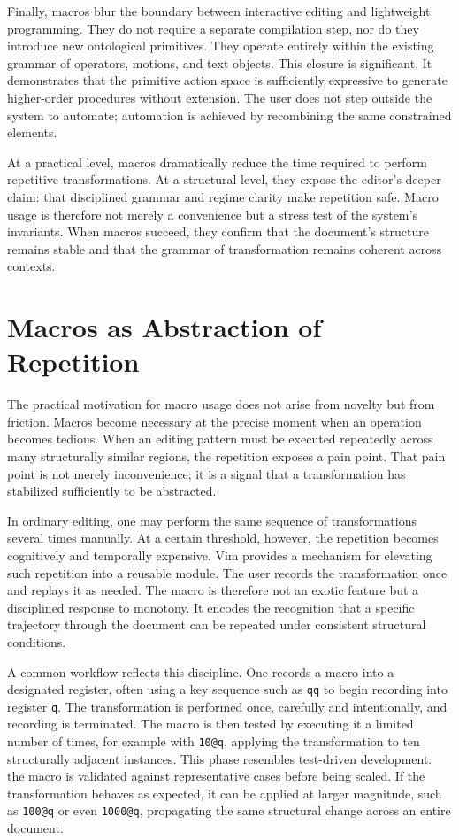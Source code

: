 \documentclass[12pt]{article}
\begin{document}
Finally, macros blur the boundary between interactive editing and lightweight programming. They do not require a separate compilation step, nor do they introduce new ontological primitives. They operate entirely within the existing grammar of operators, motions, and text objects. This closure is significant. It demonstrates that the primitive action space is sufficiently expressive to generate higher-order procedures without extension. The user does not step outside the system to automate; automation is achieved by recombining the same constrained elements.

At a practical level, macros dramatically reduce the time required to perform repetitive transformations. At a structural level, they expose the editor’s deeper claim: that disciplined grammar and regime clarity make repetition safe. Macro usage is therefore not merely a convenience but a stress test of the system’s invariants. When macros succeed, they confirm that the document’s structure remains stable and that the grammar of transformation remains coherent across contexts.

\section{Macros as Abstraction of Repetition}

The practical motivation for macro usage does not arise from novelty but from friction. Macros become necessary at the precise moment when an operation becomes tedious. When an editing pattern must be executed repeatedly across many structurally similar regions, the repetition exposes a pain point. That pain point is not merely inconvenience; it is a signal that a transformation has stabilized sufficiently to be abstracted.

In ordinary editing, one may perform the same sequence of transformations several times manually. At a certain threshold, however, the repetition becomes cognitively and temporally expensive. Vim provides a mechanism for elevating such repetition into a reusable module. The user records the transformation once and replays it as needed. The macro is therefore not an exotic feature but a disciplined response to monotony. It encodes the recognition that a specific trajectory through the document can be repeated under consistent structural conditions.

A common workflow reflects this discipline. One records a macro into a designated register, often using a key sequence such as \texttt{qq} to begin recording into register \texttt{q}. The transformation is performed once, carefully and intentionally, and recording is terminated. The macro is then tested by executing it a limited number of times, for example with \texttt{10@q}, applying the transformation to ten structurally adjacent instances. This phase resembles test-driven development: the macro is validated against representative cases before being scaled. If the transformation behaves as expected, it can be applied at larger magnitude, such as \texttt{100@q} or even \texttt{1000@q}, propagating the same structural change across an entire document.
\end{document}

